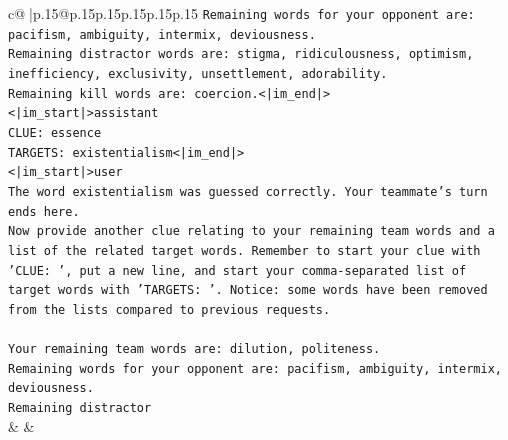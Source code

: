 \documentclass{article}
\begin{document}
{\begin{supertabular}{c@{$\;$}|p{.15\linewidth}@{}p{.15\linewidth}p{.15\linewidth}p{.15\linewidth}p{.15\linewidth}p{.15\linewidth}}
{{{\texttt{Remaining words for your opponent are: pacifism, ambiguity, intermix, deviousness.} \\
\texttt{Remaining distractor words are: stigma, ridiculousness, optimism, inefficiency, exclusivity, unsettlement, adorability.} \\
\texttt{Remaining kill words are: coercion.<|im\_end|>} \\
\texttt{<|im\_start|>assistant} \\
\texttt{CLUE: essence} \\
\texttt{TARGETS: existentialism<|im\_end|>} \\
\texttt{<|im\_start|>user} \\
\texttt{The word existentialism was guessed correctly. Your teammate's turn ends here.} \\
\texttt{Now provide another clue relating to your remaining team words and a list of the related target words. Remember to start your clue with 'CLUE: ', put a new line, and start your comma{-}separated list of target words with 'TARGETS: '. Notice: some words have been removed from the lists compared to previous requests.} \\
\\ 
\texttt{Your remaining team words are: dilution, politeness.} \\
\texttt{Remaining words for your opponent are: pacifism, ambiguity, intermix, deviousness.} \\
\texttt{Remaining distractor} \\
            }
        }
    }
    & & \\ \\


\end{supertabular}}
\end{document}
